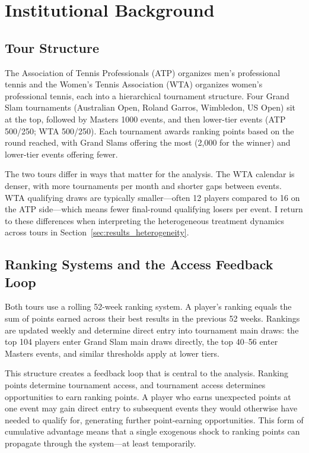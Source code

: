 \section{Institutional Background}
\label{sec:background}

\subsection{Tour Structure}

The Association of Tennis Professionals (ATP) organizes men's professional tennis and the Women's Tennis Association (WTA) organizes women's professional tennis, each into a hierarchical tournament structure. Four Grand Slam tournaments (Australian Open, Roland Garros, Wimbledon, US Open) sit at the top, followed by Masters 1000 events, and then lower-tier events (ATP 500/250; WTA 500/250). Each tournament awards ranking points based on the round reached, with Grand Slams offering the most (2,000 for the winner) and lower-tier events offering fewer.

The two tours differ in ways that matter for the analysis. The WTA calendar is denser, with more tournaments per month and shorter gaps between events. WTA qualifying draws are typically smaller---often 12 players compared to 16 on the ATP side---which means fewer final-round qualifying losers per event. I return to these differences when interpreting the heterogeneous treatment dynamics across tours in Section~\ref{sec:results_heterogeneity}.

\subsection{Ranking Systems and the Access Feedback Loop}
\label{sec:background_rankings}

Both tours use a rolling 52-week ranking system. A player's ranking equals the sum of points earned across their best results in the previous 52 weeks. Rankings are updated weekly and determine direct entry into tournament main draws: the top 104 players enter Grand Slam main draws directly, the top 40--56 enter Masters events, and similar thresholds apply at lower tiers.

This structure creates a feedback loop that is central to the analysis. Ranking points determine tournament access, and tournament access determines opportunities to earn ranking points. A player who earns unexpected points at one event may gain direct entry to subsequent events they would otherwise have needed to qualify for, generating further point-earning opportunities. This form of cumulative advantage \citep{Merton1968_matthew_effect} means that a single exogenous shock to ranking points can propagate through the system---at least temporarily.

